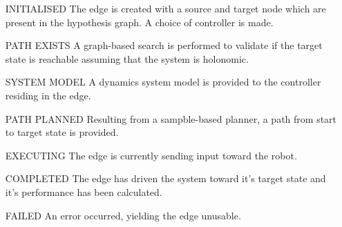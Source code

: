 \begin{enumerate}
    \item[INITIALISED] The edge is created with a source and target node which are present in the hypothesis graph. A choice of controller is made.
    \item[PATH EXISTS] A graph-based search is performed to validate if the target state is reachable assuming that the system is holonomic.
    \item[SYSTEM MODEL] A dynamics system model is provided to the controller residing in the edge.
    \item[PATH PLANNED] Resulting from a sampble-based planner, a path from start to target state is provided. 
    \item[EXECUTING] The edge is currently sending input toward the robot. 
    \item[COMPLETED] The edge has driven the system toward it's target state and it's performance has been calculated.
    \item[FAILED] An error occurred, yielding the edge unusable. 
\end{enumerate}

\newpage
{}


